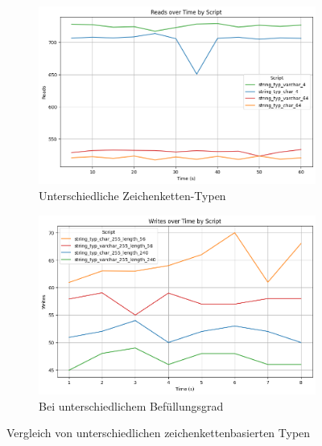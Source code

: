 \vspace{-10pt}
\begin{figure}[H]
    \centering
    \begin{subfigure}[t]{0.48\textwidth}
        \centering
        \includegraphics[width=\textwidth]{PNGs/Script/Data_Types/Smaller/string-type/Reads}
        \caption{Unterschiedliche Zeichenketten-Typen}
        \label{fig:data-types-smaller-string-type-reads}
    \end{subfigure}
    \hfill
    \begin{subfigure}[t]{0.48\textwidth}
        \centering
        \includegraphics[width=\textwidth]{PNGs/Script/Data_Types/Smaller/string-type-length/Writes}
        \caption{Bei unterschiedlichem Befüllungsgrad}
        \label{fig:data-types-smaller-string-type-length-writes}
    \end{subfigure}
    \vspace{-6pt}
    \caption[Datentypen: Zeichenkettenbasierte Typen]{Vergleich von unterschiedlichen zeichenkettenbasierten Typen}
\end{figure}